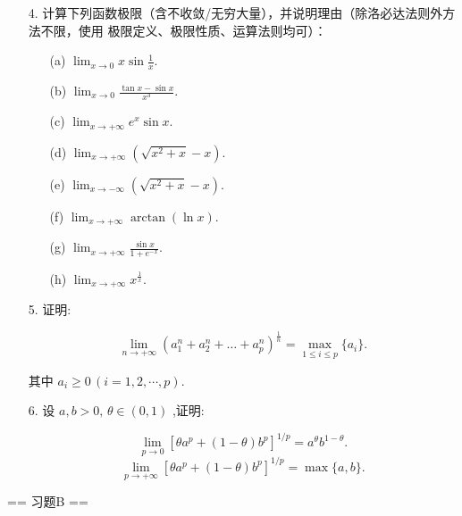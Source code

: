 \begin{enumerate}
    \item[4.]计算下列函数极限（含不收敛/无穷大量），并说明理由（除洛必达法则外方法不限，使用
    极限定义、极限性质、运算法则均可）：
    \begin{enumerate}
        \item[(a)]$\displaystyle \lim_{x\to 0}x\sin{\frac{1}{x}}$.
        \item[(b)]$\displaystyle \lim_{x\to 0}{\frac{\tan x - \sin x}{x^{3}}}.$
        \item[(c)]$\displaystyle \lim_{x\to +\infty}e^{x}\sin x.$
        \item[(d)]$\displaystyle \lim_{x\to +\infty}(\sqrt{x^{2} + x} - x).$
        \item[(e)]$\displaystyle \lim_{x\to -\infty}(\sqrt{x^{2} + x} - x).$
        \item[(f)]$\displaystyle \lim_{x\to +\infty}\arctan (\ln x).$
        \item[(g)]$\displaystyle \lim_{x\to +\infty}\frac{\sin x}{1 + e^{-x}}.$
        \item[(h)]$\displaystyle \lim_{x\to +\infty}x^{\frac{1}{x}}.$
    \end{enumerate}
    
    \item[5.]证明:

    \[\lim_{n\to +\infty}\left(a_{1}^{n} + a_{2}^{n} + \dots +a_{p}^{n}\right)^{\frac{1}{n}} = \max_{1\leq i\leq p}\{a_{i}\}.\]

    其中 $a_{i}\geq 0\,(i = 1,2,\cdots ,p)$.

    \item[6.]设 $a,b > 0,\,\theta \in (0,1)$ ,证明:

    \[\lim_{p\to 0}\left[\theta a^{p} + (1 - \theta)b^{p}\right]^{1 / p} = a^{\theta}b^{1 - \theta}.\]
    \[\lim_{p\to +\infty}\left[\theta a^{p} + (1 - \theta)b^{p}\right]^{1 / p} = \max\{a,b\}.\]
\end{enumerate}

== 习题B ==

